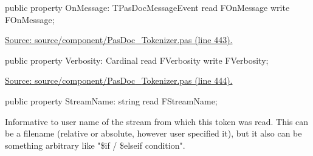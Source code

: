 \documentclass{report}
\newif\ifpdf
\begin{document}
\begin{list}{}{
\setlength{\itemindent}{0cm}
\setlength{\listparindent}{0cm}
\setlength{\leftmargin}{\evensidemargin}
\addtolength{\leftmargin}{\tmplength}
\settowidth{\labelsep}{X}
\addtolength{\leftmargin}{\labelsep}
\setlength{\labelwidth}{\tmplength}
}
\label{PasDoc_Tokenizer.TTokenizer-OnMessage}
\item[\textbf{OnMessage}\hfill]
\ifpdf
\begin{flushleft}
\fi
\begin{ttfamily}
public property OnMessage: TPasDocMessageEvent read FOnMessage write FOnMessage;\end{ttfamily}

\ifpdf
\end{flushleft}
\fi


\par  \par
\href{https://github.com/pasdoc/pasdoc/blob/master/source/component/PasDoc_Tokenizer.pas#L443}{Source: source/component/PasDoc{\_}Tokenizer.pas (line 443).}\label{PasDoc_Tokenizer.TTokenizer-Verbosity}
\item[\textbf{Verbosity}\hfill]
\ifpdf
\begin{flushleft}
\fi
\begin{ttfamily}
public property Verbosity: Cardinal read FVerbosity write FVerbosity;\end{ttfamily}

\ifpdf
\end{flushleft}
\fi


\par  \par
\href{https://github.com/pasdoc/pasdoc/blob/master/source/component/PasDoc_Tokenizer.pas#L444}{Source: source/component/PasDoc{\_}Tokenizer.pas (line 444).}\label{PasDoc_Tokenizer.TTokenizer-StreamName}
\item[\textbf{StreamName}\hfill]
\ifpdf
\begin{flushleft}
\fi
\begin{ttfamily}
public property StreamName: string read FStreamName;\end{ttfamily}

\ifpdf
\end{flushleft}
\fi


\par Informative to user name of the stream from which this token was read. This can be a filename (relative or absolute, however user specified it), but it also can be something arbitrary like "{\$}if / {\$}elseif condition".


\end{list}
\end{document}
